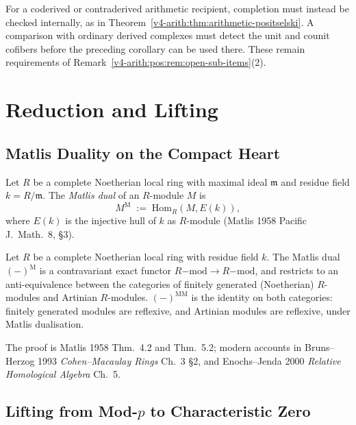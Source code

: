 For a coderived or contraderived arithmetic recipient,
completion must instead be checked internally, as in
Theorem~\ref{v4-arith:thm:arithmetic-positselski}.
A comparison with ordinary derived complexes must detect the
unit and counit cofibers before the preceding corollary can
be used there. These remain requirements of
Remark~\ref{v4-arith:pos:rem:open-sub-items}(2).

\section{Reduction and Lifting}
\label{v4-arith:w5-d:sec:faithful-lifting}

\subsection{Matlis Duality on the Compact Heart}
\label{v4-arith:w5-d:lift:matlis}

Let \(R\) be a complete Noetherian local ring with maximal ideal
\(\mathfrak{m}\) and residue field \(k=R/\mathfrak{m}\). The
\emph{Matlis dual} of an \(R\)-module \(M\) is
\begin{equation}
\label{v4-arith:w5-d:eq:matlis-def}
M^{\mathrm{M}}\;:=\;\mathrm{Hom}_{R}(M,E(k)),
\end{equation}
where \(E(k)\) is the injective hull of \(k\) as \(R\)-module
(Matlis 1958 Pacific J.~Math.~8, \S3).

\begin{theorem}
\label{v4-arith:w5-d:lift:thm:matlis}
Let \(R\) be a complete Noetherian local
ring with residue field \(k\). The Matlis dual \((-)^{\mathrm{M}}\) is a
contravariant exact functor
\(R\mathrm{-mod}\to R\mathrm{-mod}\), and restricts to an anti-equivalence
between the categories of finitely generated (Noetherian)
\(R\)-modules and Artinian \(R\)-modules. \((-)^{\mathrm{M}\mathrm{M}}\)
is the identity on both categories: finitely generated modules are
reflexive, and Artinian modules are reflexive, under Matlis dualisation.
\end{theorem}

The proof is Matlis 1958 Thm.~4.2 and Thm.~5.2; modern accounts in
Bruns--Herzog 1993 \emph{Cohen--Macaulay Rings} Ch.~3 \S2, and
Enochs--Jenda 2000 \emph{Relative Homological Algebra} Ch.~5.

\subsection{Lifting from Mod-\(p\) to Characteristic Zero}
\label{v4-arith:w5-d:lift:mod-p-to-char-zero}

